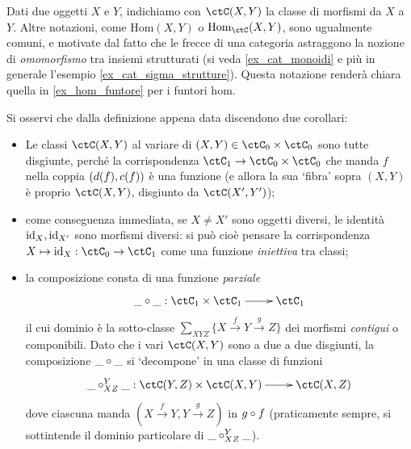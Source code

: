 \begin{notation}
	Dati due oggetti \(X\) e \(Y\), indichiamo con \(\Hom{\ctC}(X,Y)\) la classe di morfismi da \(X\) a \(Y\). Altre notazioni, come \(\mathrm{Hom}(X,Y)\) o \(\mathrm{Hom}_\ctC(X,Y)\), sono ugualmente comuni, e motivate dal fatto che le frecce di una categoria astraggono la nozione di \emph{omomorfismo} tra insiemi strutturati (si veda \ref{ex_cat_monoidi} e più in generale l'esempio \ref{ex_cat_sigma_strutture}). Questa notazione renderà chiara quella in \ref{ex_hom_funtore} per i funtori hom.
\end{notation}
\begin{remark}\label{cor_def_categ}
	Si osservi che dalla definizione appena data discendono due corollari:
	\begin{itemize}
		\item Le classi \(\Hom{\ctC}(X,Y)\) al variare di \((X,Y)\in\ctC_0\times\ctC_0\) sono tutte disgiunte, perché la corrispondenza \(\ctC_1 \to \ctC_0\times\ctC_0\) che manda \(f\) nella coppia \((d(f),c(f))\) è una funzione (e allora la sua `fibra' sopra \((X,Y)\) è proprio \(\Hom{\ctC}(X,Y)\), disgiunto da \(\Hom{\ctC}(X',Y')\));
		\item come conseguenza immediata, se \(X\ne X'\) sono oggetti diversi, le identità \(\mathrm{id}_X,\mathrm{id}_{X'}\) sono morfismi diversi: si può cioè pensare la corrispondenza \(X\mapsto \id_X : \ctC_0\to\ctC_1\) come una funzione \emph{iniettiva} tra classi;
		\item la composizione consta di una funzione \emph{parziale}
		      \[\xymatrix{\_\cmp\_ : \ctC_1 \times \ctC_1 \ar[r] & \ctC_1}\]
		      il cui dominio è la sotto-classe \(\sum_{XYZ} \{ X \xrightarrow f Y \xrightarrow g Z \}\) dei morfismi \emph{contigui} o componibili. Dato che i vari \(\ctC(X,Y)\) sono a due a due disgiunti, la composizione \(\_\circ\_\) si `decompone' in una classe di funzioni
		      \[\xymatrix{\_\cmp_{XZ}^Y\_ : \ctC(Y,Z)\times\ctC(X,Y) \ar[r] & \ctC(X,Z)}\]
		      dove ciascuna manda \(( X \xrightarrow f Y, Y \xrightarrow g Z )\) in \(g\circ f\) (praticamente sempre, si sottintende il dominio particolare di \(\_\circ_{XZ}^Y\_\)).
	\end{itemize}
\end{remark}
